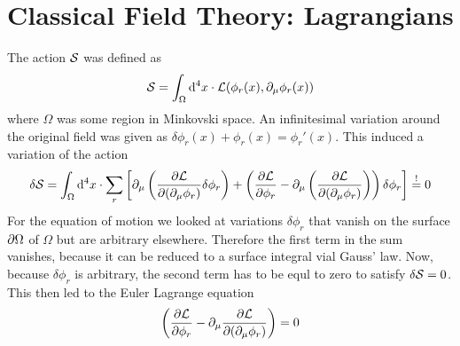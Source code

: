

\chapter{Classical Field Theory: Lagrangians}

The action $\mathcal{S}$ was defined as
\[ \mathcal{S} = \int_\Omega {\rm d}^4 x \cdot \mathcal{L}( \phi_r(x), \partial_\mu \phi_r(x))\]
where $\Omega$ was some region in Minkovski space. An infinitesimal variation around the original field was given as $\delta \phi_r(x) + \phi_r(x) = \phi_r'(x)$. This induced a variation of the action
\[ \delta \mathcal{S} = \int_\Omega {\rm d}^4 x \cdot \sum_r \left[ \partial_\mu \left( \frac{\partial \mathcal{L}}{\partial (\partial_\mu \phi_r)} \delta \phi_r \right) + \left( \frac{ \partial \mathcal{L}}{\partial \phi_r} - \partial_\mu \left( \frac{\partial \mathcal{L}}{\partial (\partial_\mu \phi_r)}\right) \right)  \delta \phi_r\right]\overset{!}{=} 0 \]
For the equation of motion we looked at variations $\delta \phi_r$ that vanish on the surface $\partial \Omega$ of $\Omega$ but are arbitrary elsewhere. Therefore the first term in the sum vanishes, because it can be reduced to a surface integral vial Gauss' law. Now, because $\delta \phi_r$ is arbitrary, the second term has to be equl to zero to satisfy $\delta \mathcal{S} = 0$. This then led to the Euler Lagrange equation
\[ \left( \frac{\partial \mathcal{L}}{\partial \phi_r} - \partial_\mu \frac{\partial \mathcal{L}}{\partial ( \partial_\mu \phi_r)} \right) = 0\] 

